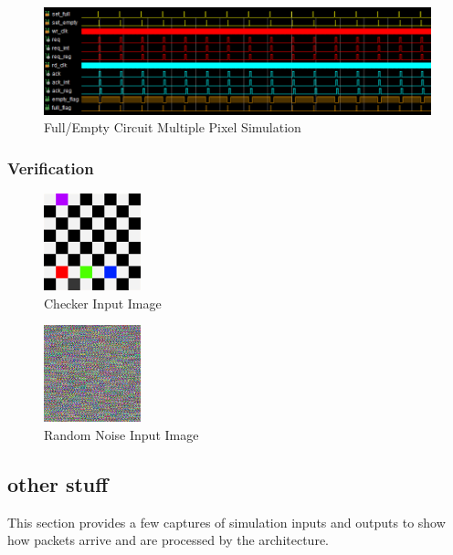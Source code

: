 \begin{figure}
    \centering
    \includegraphics[width=1.0\textwidth]{fig/full_empty_row_sim.png}
    \caption{Full/Empty Circuit Multiple Pixel Simulation}
    \label{fig:full_empty_row_sim}
\end{figure}

\subsubsection{Verification}

\begin{figure}
    \centering
    \includegraphics[width=0.25\textwidth]{fig/checker.png}
    \caption{Checker Input Image}
    \label{fig:checker_pattern}
\end{figure}

\begin{figure}
    \centering
    \includegraphics[width=0.25\textwidth]{fig/random_noise.png}
    \caption{Random Noise Input Image}
    \label{fig:random_noise}
\end{figure}

\subsection{other stuff}
This section provides a few captures of simulation inputs and outputs to show how packets arrive and are processed by the architecture.


